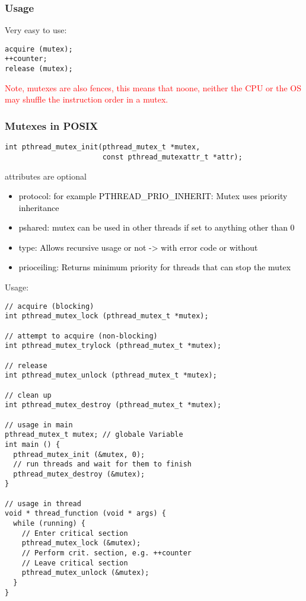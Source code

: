 \documentclass[main.tex,fontsize=8pt,paper=a4,paper=portrait,DIV=calc,]{scrartcl}
\begin{document}
\subsubsection{Usage}
Very easy to use:
\begin{lstlisting}
acquire (mutex);
++counter;
release (mutex);
\end{lstlisting}
\textcolor{red}{Note, mutexes are also fences, this means that noone, neither the CPU or the OS may shuffle the instruction order in a mutex.}

\subsubsection{Mutexes in POSIX}
\begin{lstlisting}
int pthread_mutex_init(pthread_mutex_t *mutex,
                       const pthread_mutexattr_t *attr);
\end{lstlisting}
attributes are optional
  \begin{itemize}
    \item \textcolor{black}{protocol: for example PTHREAD\_PRIO\_INHERIT: Mutex uses priority inheritance}
  \item \textcolor{black}{pshared: mutex can be used in other threads if set to anything other than 0}
  \item \textcolor{black}{type: Allows recursive usage or not -> with error code or without}
  \item \textcolor{black}{prioceiling: Returns minimum priority for threads that can stop the mutex}
  \end{itemize} 
Usage:
\begin{lstlisting}
// acquire (blocking)
int pthread_mutex_lock (pthread_mutex_t *mutex);

// attempt to acquire (non-blocking)
int pthread_mutex_trylock (pthread_mutex_t *mutex);

// release
int pthread_mutex_unlock (pthread_mutex_t *mutex);

// clean up
int pthread_mutex_destroy (pthread_mutex_t *mutex);

// usage in main
pthread_mutex_t mutex; // globale Variable
int main () {
  pthread_mutex_init (&mutex, 0);
  // run threads and wait for them to finish
  pthread_mutex_destroy (&mutex);
}

// usage in thread
void * thread_function (void * args) {
  while (running) {
    // Enter critical section
    pthread_mutex_lock (&mutex);
    // Perform crit. section, e.g. ++counter
    // Leave critical section
    pthread_mutex_unlock (&mutex);
  }
}
\end{lstlisting}
\end{document}
